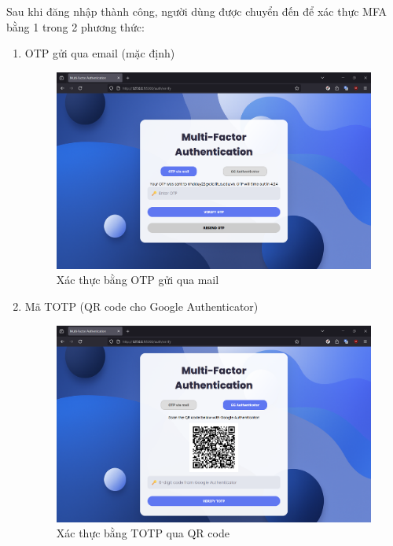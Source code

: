 Sau khi đăng nhập thành công, người dùng được chuyển đến  để xác thực MFA bằng 1 trong 2 phương thức:
\begin{enumerate}
    \item OTP gửi qua email (mặc định)
    \begin{figure}[H]
    \centering
    \includegraphics[scale=0.28]{img/MFA-OTP.png}
    \caption{Xác thực bằng OTP gửi qua mail}
    \label{fig:opt_ui}
    \end{figure}
    
    \item Mã TOTP (QR code cho Google Authenticator)
    \begin{figure}[H]
    \centering
    \includegraphics[scale=0.28]{img/MFA-TOTP.png}
    \caption{Xác thực bằng TOTP qua QR code}
    \label{fig:totp_ui}
    \end{figure}
\end{enumerate}

